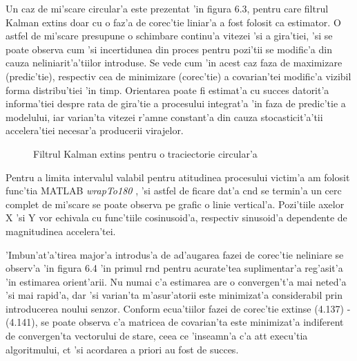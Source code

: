 \documentclass[12pt,a4paper,twoside]{report}
\begin{document}
\vspace{5px}

Un caz de mi'scare circular'a este prezentat 'in figura 6.3, pentru care filtrul Kalman extins doar cu o faz'a de corec'tie liniar'a a fost folosit ca estimator. O astfel de mi'scare presupune o schimbare continu'a vitezei 'si a gira'tiei, 'si se poate observa cum 'si incertidunea din proces pentru pozi'tii se modific'a din cauza neliniarit'a'tiilor introduse. Se vede cum 'in acest caz faza de maximizare (predic'tie), respectiv cea de minimizare (corec'tie) a covarian'tei modific'a vizibil forma distribu'tiei 'in timp. Orientarea poate fi estimat'a cu succes datorit'a informa'tiei despre rata de gira'tie a procesului integrat'a 'in faza de predic'tie a modelului, iar varian'ta vitezei r'am\ia ne constant'a din cauza stocasticit'a'tii accelera'tiei necesar'a producerii virajelor.

%  

\begin{figure}[h]
\hspace*{-5cm}
 
 \caption{Filtrul Kalman extins pentru o traciectorie circular'a}
\end{figure}

Pentru a limita intervalul valabil pentru atitudinea procesului victim'a am folosit func'tia MATLAB \textit{wrapTo180} \cite{wrap} , 'si astfel de ficare dat'a c\ia nd se termin'a un cerc complet de mi'scare se poate observa pe grafic o linie vertical'a. Pozi'tiile axelor X 'si Y vor echivala cu func'tiile cosinusoid'a, respectiv sinusoid'a dependente de magnitudinea  accelera'tei. 

\vspace{5px}

'Imbun'at'a'tirea major'a introdus'a de ad'augarea fazei de corec'tie neliniare se observ'a 'in figura 6.4 'in primul r\ia nd pentru acurate'tea suplimentar'a reg'asit'a 'in estimarea orient'arii. Nu numai c'a estimarea are o convergen't'a mai neted'a 'si mai rapid'a, dar 'si varian'ta m'asur'atorii este minimizat'a considerabil prin introducerea noului senzor. Conform ecua'tiilor fazei de corec'tie extinse (4.137) - (4.141), se poate observa c'a matricea de covarian'ta este minimizat'a indiferent de convergen'ta vectorului de stare, ceea ce 'inseamn'a c'a at\ia t execu'tia algoritmului, c\ia t 'si acordarea a priori au fost de succes.
\end{document}
